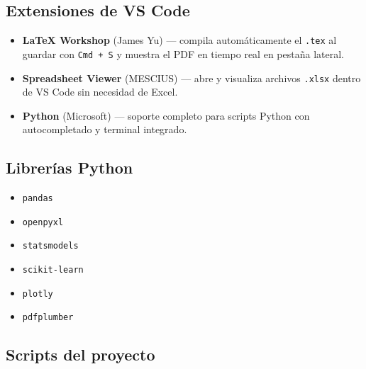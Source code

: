 \documentclass{article}
\begin{document}
\subsection{Extensiones de VS Code}

\begin{itemize}
    \item \textbf{LaTeX Workshop} (James Yu) — compila automáticamente el
    \texttt{.tex} al guardar con \texttt{Cmd + S} y muestra el PDF en tiempo
    real en pestaña lateral.
    \item \textbf{Spreadsheet Viewer} (MESCIUS) — abre y visualiza archivos
    \texttt{.xlsx} dentro de VS Code sin necesidad de Excel.
    \item \textbf{Python} (Microsoft) — soporte completo para scripts Python
    con autocompletado y terminal integrado.
\end{itemize}

\subsection{Librerías Python}

\begin{itemize}
    \item \texttt{pandas}
    \item \texttt{openpyxl}
    \item \texttt{statsmodels}
    \item \texttt{scikit-learn}
    \item \texttt{plotly}
    \item \texttt{pdfplumber}
\end{itemize}

\subsection{Scripts del proyecto}
\end{document}
